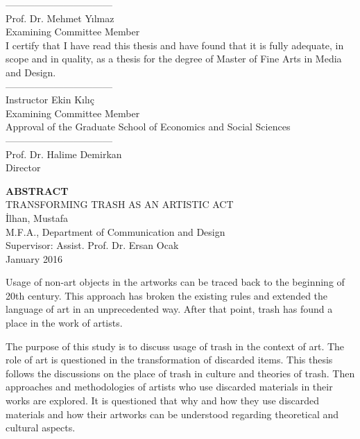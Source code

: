 \documentclass[12pt]{report}
\begin{document}
\noindent---------------------------------\\
Prof. Dr. Mehmet Yılmaz\\
Examining Committee Member\\

\noindent I certify that I have read this thesis and have found that it is fully adequate, in scope and in quality, as a thesis for the degree of Master of Fine Arts in Media and Design.\\

\noindent---------------------------------\\
Instructor Ekin Kılıç\\
Examining Committee Member\\

\noindent Approval of the Graduate School of Economics and Social Sciences\\

\noindent---------------------------------\\
Prof. Dr. Halime Demirkan\\
Director\\

\clearpage


\thispagestyle{plain}
{}
\doublespacing
\begin{center}
	\vspace*{8mm}
	{\fontsize{14pt}{14pt}\selectfont \textbf{\MakeUppercase{Abstract}}}\\
    \vspace{\baselineskip}
    TRANSFORMING TRASH AS AN ARTISTIC ACT\\
    İlhan, Mustafa\\
    M.F.A., Department of Communication and Design\\
    Supervisor: Assist. Prof. Dr. Ersan Ocak\\
    \vspace{\baselineskip}
    January 2016
\end{center}
\singlespacing
\par Usage of non-art objects in the artworks can be traced back to the beginning of 20th century. This approach has broken the existing rules and extended the language of art in an unprecedented way. After that point, trash has found a place in the work of artists.

The purpose of this study is to discuss usage of trash in the context of art. The role of art is questioned in the transformation of discarded items. This thesis follows the discussions on the place of trash in culture and theories of trash. Then approaches and methodologies of artists who use discarded materials in their works are explored. It is questioned that why and how they use discarded materials and how their artworks can be understood regarding theoretical and cultural aspects.
\end{document}
